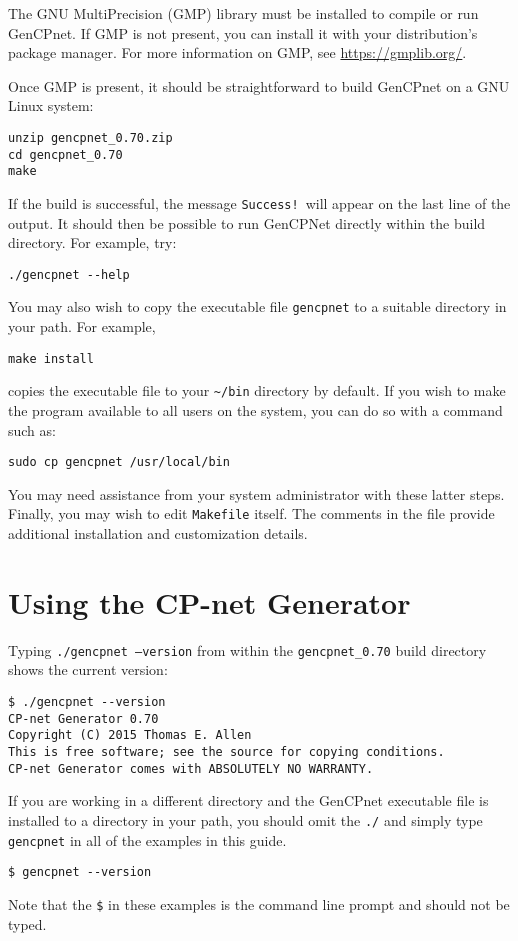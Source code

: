 \documentclass{article}
\begin{document}
The GNU MultiPrecision (GMP) library must be installed to compile or
run GenCPnet.  If GMP is not present, you can install it with your
distribution's package manager.  For more information on GMP, see
\url{https://gmplib.org/}.

Once GMP is present, it should be straightforward to build GenCPnet on
a GNU Linux system:
\begin{verbatim}
unzip gencpnet_0.70.zip
cd gencpnet_0.70
make
\end{verbatim}
If the build is successful, the message \texttt{Success!}~will appear
on the last line of the output.  It should then be possible to run
GenCPNet directly within the build directory.  For example, try:
\begin{verbatim}
./gencpnet --help
\end{verbatim}

You may also wish to copy the executable file \texttt{gencpnet} to a
suitable directory in your path.  For example,
\begin{verbatim}
make install
\end{verbatim}
copies the executable file to your \verb|~/bin| directory by default.
If you wish to make the program available to all users on the system,
you can do so with a command such as:
\begin{verbatim}
sudo cp gencpnet /usr/local/bin
\end{verbatim}
You may need assistance from your system administrator with these
latter steps.  Finally, you may wish to edit \texttt{Makefile} itself.
The comments in the file provide additional installation and
customization details.

\section{Using the CP-net Generator}

Typing \texttt{./gencpnet --version} from within the
\verb|gencpnet_0.70| build directory shows the current version:
\begin{verbatim}
$ ./gencpnet --version
CP-net Generator 0.70
Copyright (C) 2015 Thomas E. Allen
This is free software; see the source for copying conditions.
CP-net Generator comes with ABSOLUTELY NO WARRANTY.
\end{verbatim}
If you are working in a different directory and the GenCPnet
executable file is installed to a directory in your path, you should
omit the \texttt{./} and simply type \texttt{gencpnet} in all of the 
examples in this guide.
\begin{verbatim}
$ gencpnet --version
\end{verbatim}
Note that the
\verb|$| in these examples is the command line prompt and should not
be typed.
\end{document}

